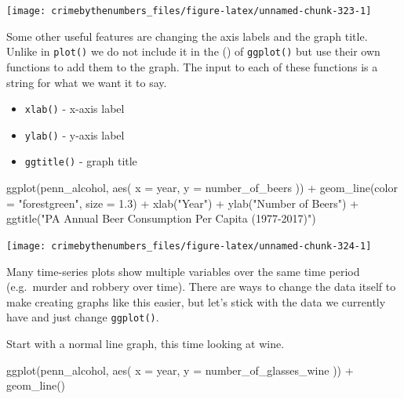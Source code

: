 \documentclass[
  a4paper,
]{krantz}
\makeatletter
\newenvironment{Shaded}{\begin{snugshade}}{\end{snugshade}}
\newcommand{\AttributeTok}[1]{\textcolor[rgb]{0.61,0.61,0.61}{#1}}
\newcommand{\FloatTok}[1]{\textcolor[rgb]{0.06,0.06,0.06}{#1}}
\newcommand{\FunctionTok}[1]{\textcolor[rgb]{0,0,0}{#1}}
\newcommand{\NormalTok}[1]{#1}
\newcommand{\SpecialCharTok}[1]{\textcolor[rgb]{0,0,0}{#1}}
\newcommand{\StringTok}[1]{\textcolor[rgb]{0.5,0.5,0.5}{#1}}
\providecommand{\tightlist}{%
  \setlength{\itemsep}{0pt}\setlength{\parskip}{0pt}}
\newenvironment{kframe}{%
\medskip{}
\setlength{\fboxsep}{.8em}
 \def\at@end@of@kframe{}%
 \ifinner\ifhmode%
  \def\at@end@of@kframe{\end{minipage}}%
  \begin{minipage}{\columnwidth}%
 \fi\fi%
 \def\FrameCommand##1{\hskip\@totalleftmargin \hskip-\fboxsep
 \colorbox{shadecolor}{##1}\hskip-\fboxsep
     \hskip-\linewidth \hskip-\@totalleftmargin \hskip\columnwidth}%
 \MakeFramed {\advance\hsize-\width
   \@totalleftmargin\z@ \linewidth\hsize
   \@setminipage}}%
 {\par\unskip\endMakeFramed%
 \at@end@of@kframe}
\renewenvironment{Shaded}{\begin{kframe}}{\end{kframe}}
\makeatother
\begin{document}
\begin{center}\texttt{[image: crimebythenumbers\_files/figure-latex/unnamed-chunk-323-1]} \end{center}

Some other useful features are changing the axis labels and
the graph title. Unlike in \texttt{plot()} we do not include
it in the () of \texttt{ggplot()} but use their own
functions to add them to the graph. The input to each of
these functions is a string for what we want it to say.

\begin{itemize}
\tightlist
\item
  \texttt{xlab()} - x-axis label
\item
  \texttt{ylab()} - y-axis label
\item
  \texttt{ggtitle()} - graph title
\end{itemize}

\begin{Shaded}
\begin{Highlighting}[]
\FunctionTok{ggplot}\NormalTok{(penn\_alcohol, }\FunctionTok{aes}\NormalTok{(}
  \AttributeTok{x =}\NormalTok{ year,}
  \AttributeTok{y =}\NormalTok{ number\_of\_beers}
\NormalTok{)) }\SpecialCharTok{+}
  \FunctionTok{geom\_line}\NormalTok{(}\AttributeTok{color =} \StringTok{"forestgreen"}\NormalTok{, }\AttributeTok{size =} \FloatTok{1.3}\NormalTok{) }\SpecialCharTok{+}
  \FunctionTok{xlab}\NormalTok{(}\StringTok{"Year"}\NormalTok{) }\SpecialCharTok{+}
  \FunctionTok{ylab}\NormalTok{(}\StringTok{"Number of Beers"}\NormalTok{) }\SpecialCharTok{+}
  \FunctionTok{ggtitle}\NormalTok{(}\StringTok{"PA Annual Beer Consumption Per Capita (1977{-}2017)"}\NormalTok{)}
\end{Highlighting}
\end{Shaded}

\begin{center}\texttt{[image: crimebythenumbers\_files/figure-latex/unnamed-chunk-324-1]} \end{center}

Many time-series plots show multiple variables over the same
time period (e.g.~murder and robbery over time). There are
ways to change the data itself to make creating graphs like
this easier, but let's stick with the data we currently have
and just change \texttt{ggplot()}.

Start with a normal line graph, this time looking at wine.

\begin{Shaded}
\begin{Highlighting}[]
\FunctionTok{ggplot}\NormalTok{(penn\_alcohol, }\FunctionTok{aes}\NormalTok{(}
  \AttributeTok{x =}\NormalTok{ year,}
  \AttributeTok{y =}\NormalTok{ number\_of\_glasses\_wine}
\NormalTok{)) }\SpecialCharTok{+}
  \FunctionTok{geom\_line}\NormalTok{()}
\end{Highlighting}
\end{Shaded}
\end{document}
